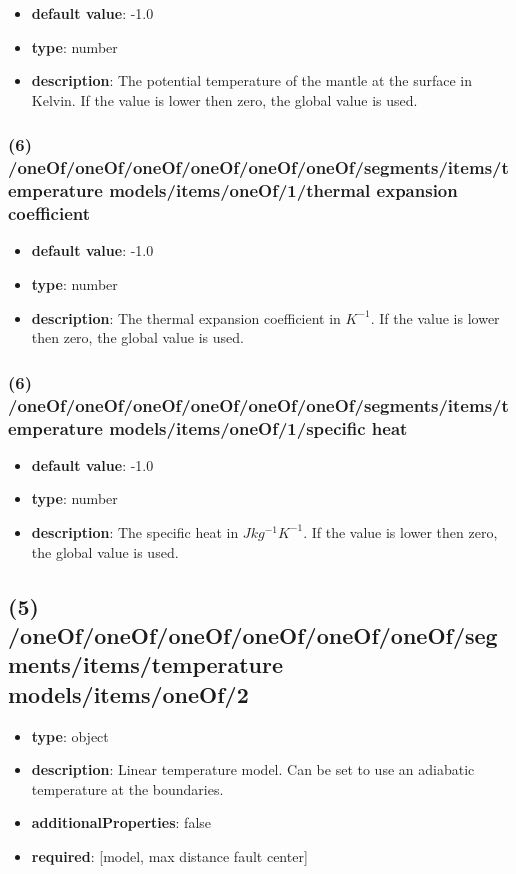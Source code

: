\begin{itemize}[leftmargin=6em]\item {\bf default value}: -1.0
\item {\bf type}: number
\item {\bf description}: The potential temperature of the mantle at the surface in Kelvin. If the value is lower then zero, the global value is used.
\end{itemize}\subsubsection{(6) /oneOf/oneOf/oneOf/oneOf/oneOf/oneOf/segments/items/temperature models/items/oneOf/1/thermal expansion coefficient}
\begin{itemize}[leftmargin=6em]\item {\bf default value}: -1.0
\item {\bf type}: number
\item {\bf description}: The thermal expansion coefficient in $K^{-1}$. If the value is lower then zero, the global value is used.
\end{itemize}\subsubsection{(6) /oneOf/oneOf/oneOf/oneOf/oneOf/oneOf/segments/items/temperature models/items/oneOf/1/specific heat}
\begin{itemize}[leftmargin=6em]\item {\bf default value}: -1.0
\item {\bf type}: number
\item {\bf description}: The specific heat in $J kg^{-1} K^{-1}$. If the value is lower then zero, the global value is used.
\end{itemize}\subsection{(5) /oneOf/oneOf/oneOf/oneOf/oneOf/oneOf/segments/items/temperature models/items/oneOf/2}
\begin{itemize}[leftmargin=5em]\item {\bf type}: object
\item {\bf description}: Linear temperature model. Can be set to use an adiabatic temperature at the boundaries.
\item {\bf additionalProperties}: false
\item {\bf required}: [model, max distance fault center]\end{itemize}

